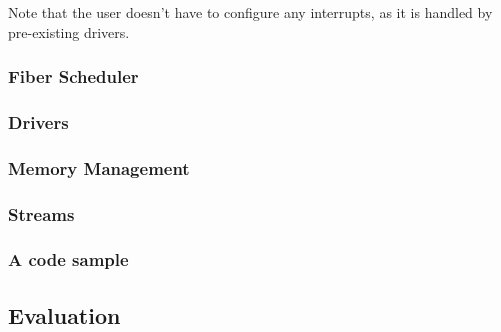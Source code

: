 Note that the user doesn't have to configure any interrupts, as it is handled by pre-existing drivers.


\subsubsection{Fiber Scheduler}


\subsubsection{Drivers}


\subsubsection{Memory Management}


\subsubsection{Streams}


\subsubsection{A code sample}


\subsection{Evaluation}

